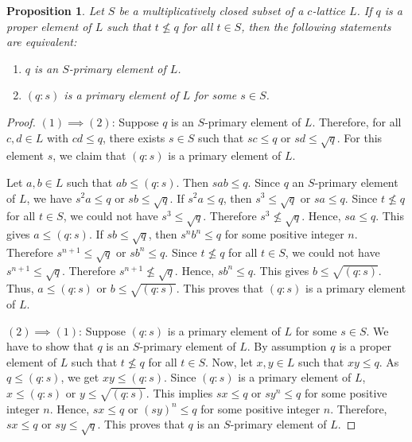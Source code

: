 \documentclass[10pt,twoside,a4paper]{amsart}
\numberwithin{equation}{section}
\theoremstyle{plain}
\newtheorem{prop}[lem]{Proposition}
\theoremstyle{definition}
\begin{document}
\begin{prop}\label{P3.4} 
	Let $S$ be a multiplicatively closed subset of a $c$-lattice $L$. If $q$ is a proper element of $L$ such that $t\nleq q$ for all $t\in S$, then the following statements are equivalent:
	\begin{enumerate}
		\item $q$ is an $S$-primary element of $L$.
		
		\item $(q:s)$ is a primary element of $L$ for some $s\in S$.
	\end{enumerate}
\end{prop}

\begin{proof} 
	$(1)\implies (2)$: Suppose $q$ is an $S$-primary element of $L$. Therefore, for all $c,d\in L$ with $cd\leq q$, there exists $s\in S$ such that $sc\leq q$ or $sd\leq \sqrt q$. For this element $s$, we claim that $(q:s)$ is a primary element of $L$.
	
	Let $a,b \in L$ such that $ab \leq (q:s)$. Then $sab \leq q$. Since $q$ an $S$-primary element of $L$, we have $s^2a \leq q$ or $sb\leq \sqrt q$. If $s^2a\leq q$, then $s^3\leq \sqrt q$ or $sa\leq q$. Since $t\nleq q$ for all $t\in S$, we could not have $s^3\leq \sqrt{q}$. Therefore  $s^3\nleq \sqrt q$. Hence, $sa\leq q$. This gives $a \leq (q:s)$. If $sb \leq \sqrt q$, then $s^nb^n\leq q$ for some positive integer $n$. Therefore $s^{n+1}\leq \sqrt q$ or $sb^n\leq q$. Since $t\nleq q$ for all $t\in S$, we could not have $s^{n+1} \leq \sqrt q$. Therefore $s^{n+1}\nleq \sqrt q$. Hence, $sb^n \leq q$. This gives $b \leq \sqrt{(q:s)}$.  Thus, $a \leq (q:s)$ or $b\leq \sqrt{(q:s)}$. This proves that $(q:s)$ is a primary element of $L$.
	
	$(2)\implies (1)$: Suppose $(q:s)$ is a primary element of $L$ for some $s\in S$. We have to show that $q$ is an $S$-primary element of $L$. By assumption $q$ is a proper element of $L$ such that $t\nleq q$ for all $t\in S$.   Now, let $x,y\in L$ such that $xy\leq q$. As $q \leq (q:s)$, we get  $xy\leq (q:s)$. Since $(q:s)$ is a primary element of $L$, $x \leq (q:s)$ or $y\leq \sqrt {(q:s)}$. This implies $sx\leq q$ or $sy^n\leq q$ for some positive integer $n$. Hence, $sx\leq q$ or $(sy)^n\leq q$ for some positive integer $n$. Therefore, $sx\leq q$ or $sy\leq \sqrt q$. This proves that $q$ is an $S$-primary element of $L$.
\end{proof}	
\end{document}
